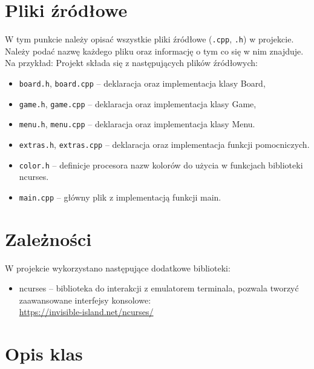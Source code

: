 \documentclass{article}
\begin{document}
\section{Pliki źródłowe}

W tym punkcie należy opisać wszystkie pliki źródłowe (\texttt{.cpp}, \texttt{.h}) w projekcie. Należy podać nazwę 
każdego pliku oraz informację o tym co się w nim znajduje. Na przykład:
Projekt składa się z następujących plików źródłowych:
    \begin{itemize}
    \item \texttt{board.h}, \texttt{board.cpp} – deklaracja oraz implementacja klasy Board,
    \item \texttt{game.h}, \texttt{game.cpp} – deklaracja oraz implementacja klasy Game,
    \item \texttt{menu.h}, \texttt{menu.cpp} – deklaracja oraz implementacja klasy Menu.
    \item \texttt{extras.h}, \texttt{extras.cpp} – deklaracja oraz implementacja funkcji pomocniczych.
    \item \texttt{color.h} – definicje procesora nazw kolorów do użycia w funkcjach biblioteki ncurses.
    \item \texttt{main.cpp} – główny plik z implementacją funkcji main.
    \end{itemize}

\section{Zależności}

W projekcie wykorzystano następujące dodatkowe biblioteki:
    \begin{itemize}
    \item ncurses – biblioteka do interakcji z emulatorem terminala,  
    pozwala tworzyć zaawansowane interfejsy konsolowe:\\
    \url{https://invisible-island.net/ncurses/}
    \end{itemize}
\section{Opis klas}
\end{document}
